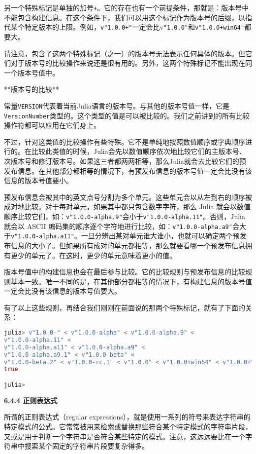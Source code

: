 另一个特殊标记是单独的加号\verb|+|。它的存在也有一个前提条件，那就是：版本号中不能包含构建信息。在这个条件下，我们可以用这个标记作为版本号的后缀，以指代某个特定版本的上限。例如，\verb|v"1.0.0+"|一定会比v\verb|"1.0.0"|和\verb|v"1.0.0+win64"|都要大。

请注意，包含了这两个特殊标记（之一）的版本号无法表示任何具体的版本。但它们对于版本号的比较操作来说还是很有用的。另外，这两个特殊标记不能出现在同一个版本号值中。

**版本号的比较**

常量\verb|VERSION|代表着当前Julia语言的版本号。与其他的版本号值一样，它是\verb|VersionNumber|类型的。这个类型的值是可以被比较的。我们之前讲到的所有比较操作符都可以应用在它们身上。

不过，针对这类值的比较操作有些特殊。它不是单纯地按照数值顺序或字典顺序进行的。在比较此类值的时候，Julia会先以数值顺序依次地比较它们的主版本号、次版本号和修订版本号。如果这三者都两两相等，那么Julia就会去比较它们的预发布信息。在其他部分都相等的情况下，有预发布信息的版本号值一定会比没有该信息的版本号值要小。

预发布信息会被其中的英文点号分割为多个单元。这些单元会以从左到右的顺序被成对地比较。对于每对单元，如果其中都只包含数字字符，那么 Julia 就会以数值顺序比较它们，如：\verb|v"1.0.0-alpha.9"|会小于\verb|v"1.0.0-alpha.11"|。否则，Julia 就会以 ASCII 编码集的顺序逐个字符地进行比较，如：\verb|v"1.0.0-alpha.a9"|会大于\verb|v"1.0.0-alpha.a11"|。一旦分辨出某对单元谁大谁小，也就可以确定两个预发布信息的大小了。但如果所有成对的单元都相等，那么就要看哪一个预发布信息拥有更少的单元了。在这时，更少的单元意味着更小的值。

版本号值中的构建信息也会在最后参与比较。它的比较规则与预发布信息的比较规则基本一致。唯一不同的是，在其他部分都相等的情况下，有构建信息的版本号值一定会比没有该信息的版本号值要大。

有了以上这些规则，再结合我们刚刚在前面说的那两个特殊标记，就有了下面的关系：
\begin{lstlisting}[language=julia]
julia> v"1.0.0-" < v"1.0.0-alpha" < v"1.0.0-alpha.9" < 
v"1.0.0-alpha.11" < 
v"1.0.0-alpha.a11" < v"1.0.0-alpha.a9" < 
v"1.0.0-alpha.a9.1" < v"1.0.0-beta" < 
v"1.0.0-beta.2" < v"1.0.0-rc.1" < v"1.0.0" < v"1.0.0+win64" < v"1.0.0+"
true

julia> 
\end{lstlisting}

\textbf{6.4.4 正则表达式}

所谓的正则表达式（regular expressions），就是使用一系列的符号来表达字符串的特定模式的公式。它常常被用来检索或替换那些符合某个特定模式的字符串片段，又或是用于判断一个字符串是否符合某些特定的模式。注意，这远远要比在一个字符串中搜索某个固定的字符串片段要复杂得多。

